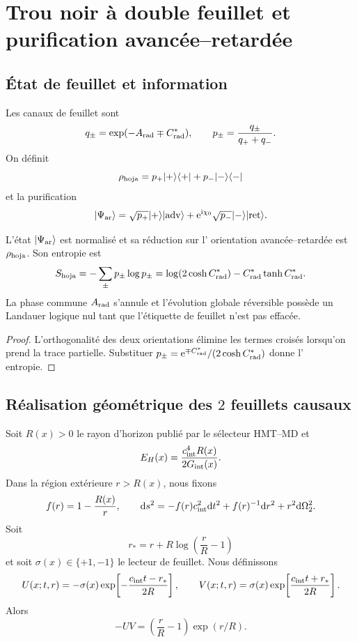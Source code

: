 \section{Trou noir à double feuillet et purification avancée--retardée}
\label{sec:hmtf2-agujero-negro}

\subsection{État de feuillet et information}

Les canaux de feuillet sont
\[
 q_\pm=\exp(-A_{\rm rad}\mp C_{\rm rad}^*),\qquad
 p_\pm=\frac{q_\pm}{q_++q_-}.
\]
On définit
\[
 \rho_{\rm hoja}
 =p_+|+\rangle\langle+|+p_-|-\rangle\langle-|
\]
et la purification
\[
 |\Psi_{\rm ar}\rangle
 =\sqrt{p_+}|+\rangle|{\rm adv}\rangle
 +\mathrm e^{{\rm i}\chi_0}
  \sqrt{p_-}|-\rangle|{\rm ret}\rangle.
\]

\begin{proposition}
\label{prop:hmtf2-purificacion-hojas}
L'état \(|\Psi_{\rm ar}\rangle\) est normalisé et sa réduction sur l'
orientation avancée--retardée est \(\rho_{\rm hoja}\). Son entropie est
\[
 S_{\rm hoja}
 =-\sum_\pm p_\pm\log p_\pm
 =\log(2\cosh C_{\rm rad}^*)
  -C_{\rm rad}^*\tanh C_{\rm rad}^*.
\]
La phase commune \(A_{\rm rad}\) s'annule et l'évolution globale réversible
possède un Landauer logique nul tant que l'étiquette de feuillet n'est pas effacée.
\end{proposition}

\begin{proof}
L'orthogonalité des deux orientations élimine les termes croisés lorsqu'on
prend la trace partielle. Substituer
\(p_\pm=\mathrm e^{\mp C_{\rm rad}^*}/(2\cosh C_{\rm rad}^*)\) donne l'
entropie.
\end{proof}

\subsection{Réalisation géométrique des \(2\) feuillets causaux}

Soit \(R(x)>0\) le rayon d'horizon publié par le sélecteur HMT--MD et
\[
 E_H(x)=\frac{c_{\rm int}^4R(x)}{2G_{\rm int}(x)}.
\]
Dans la région extérieure \(r>R(x)\), nous fixons
\[
 f(r)=1-\frac{R(x)}r,\qquad
 \mathrm ds^2=-f(r)c_{\rm int}^2\mathrm dt^2
 +f(r)^{-1}\mathrm dr^2+r^2\mathrm d\Omega_2^2.
\]
Soit
\[
 r_*=r+R\log\!\left(\frac rR-1\right)
\]
et soit \(\sigma(x)\in\{+1,-1\}\) le lecteur de feuillet. Nous définissons
\[
 U(x;t,r)
 =-\sigma(x)\exp\!\left[-\frac{c_{\rm int}t-r_*}{2R}\right],
 \qquad
 V(x;t,r)
 = \sigma(x)\exp\!\left[\frac{c_{\rm int}t+r_*}{2R}\right].
\]
Alors
\[
 -UV=\left(\frac rR-1\right)\exp(r/R).
\]

